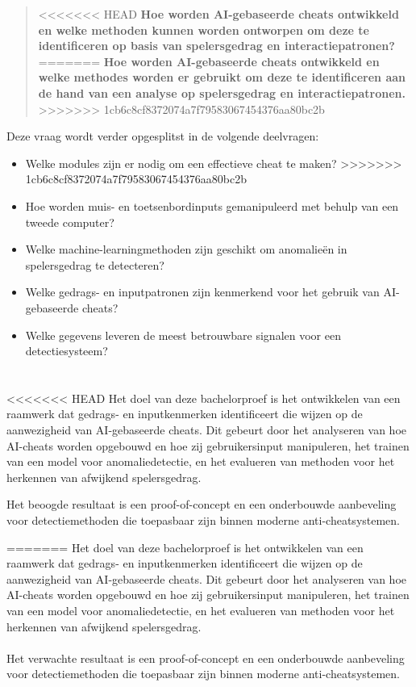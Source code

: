 \begin{quote}
<<<<<<< HEAD
\textbf{Hoe worden AI-gebaseerde cheats ontwikkeld en welke methoden kunnen worden ontworpen om deze te identificeren op basis van spelersgedrag en interactiepatronen?}
=======
\textbf{Hoe worden AI-gebaseerde cheats ontwikkeld en welke methodes worden er gebruikt om deze te identificeren aan de hand van een analyse op spelersgedrag en interactiepatronen.}
>>>>>>> 1cb6c8cf8372074a7f79583067454376aa80bc2b
\end{quote}

Deze vraag wordt verder opgesplitst in de volgende deelvragen:

\begin{itemize}
<<<<<<< HEAD
=======
    \item Welke modules zijn er nodig om een effectieve cheat te maken?
>>>>>>> 1cb6c8cf8372074a7f79583067454376aa80bc2b
    \item Hoe worden muis- en toetsenbordinputs gemanipuleerd met behulp van een tweede computer?
    \item Welke machine-learningmethoden zijn geschikt om anomalieën in spelersgedrag te detecteren?
    \item Welke gedrags- en inputpatronen zijn kenmerkend voor het gebruik van AI-gebaseerde cheats?
    \item Welke gegevens leveren de meest betrouwbare signalen voor een detectiesysteem?
\end{itemize}

\section{}%
\label{sec:onderzoeksdoelstelling}

<<<<<<< HEAD
Het doel van deze bachelorproef is het ontwikkelen van een raamwerk dat gedrags- en inputkenmerken identificeert die wijzen op de aanwezigheid van AI-gebaseerde cheats. Dit gebeurt door het analyseren van hoe AI-cheats worden opgebouwd en hoe zij gebruikersinput manipuleren, het trainen van een model voor anomaliedetectie, en het evalueren van methoden voor het herkennen van afwijkend spelersgedrag.

Het beoogde resultaat is een proof-of-concept en een onderbouwde aanbeveling voor detectiemethoden die toepasbaar zijn binnen moderne anti-cheatsystemen.

=======
Het doel van deze bachelorproef is het ontwikkelen van een raamwerk dat gedrags- en inputkenmerken identificeert die wijzen op de aanwezigheid van AI-gebaseerde cheats. 
Dit gebeurt door het analyseren van hoe AI-cheats worden opgebouwd en hoe zij gebruikersinput manipuleren, het trainen van een model voor anomaliedetectie, en het evalueren van methoden voor het herkennen van afwijkend spelersgedrag.
\\\\
Het verwachte resultaat is een proof-of-concept en een onderbouwde aanbeveling voor detectiemethoden die toepasbaar zijn binnen moderne anti-cheatsystemen.

